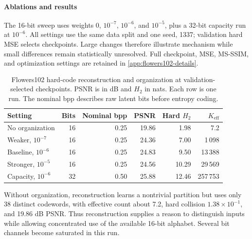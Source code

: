 \paragraph{Ablations and results}
The 16-bit sweep uses weights $0$, $10^{-7}$, $10^{-6}$, and $10^{-5}$, plus a 32-bit capacity run at $10^{-6}$.
All settings use the same data split and one seed, 1337; validation hard MSE selects checkpoints.
Large changes therefore illustrate mechanism while small differences remain statistically unresolved.
Full checkpoint, MSE, MS-SSIM, and optimization settings are retained in \ref{app:flowers102-details}.

\begin{table}[t]
\centering\small
\begin{tabular}{lrrrrr}
\toprule
Setting & Bits & Nominal bpp & PSNR & Hard $H_2$ & $K_{\mathrm{eff}}$ \\
\midrule
No organization & 16 & 0.25 & 19.86 & 1.98 & 7.2 \\
Weaker, $10^{-7}$ & 16 & 0.25 & 24.36 & 7.00 & 1\,098 \\
Baseline, $10^{-6}$ & 16 & 0.25 & 24.83 & 9.50 & 13\,388 \\
Stronger, $10^{-5}$ & 16 & 0.25 & 24.56 & 10.29 & 29\,569 \\
Capacity, $10^{-6}$ & 32 & 0.50 & 25.88 & 12.46 & 257\,753 \\
\bottomrule
\end{tabular}
\caption{Flowers102 hard-code reconstruction and organization at validation-selected checkpoints. PSNR is in dB and $H_2$ in nats. Each row is one run. The nominal bpp describes raw latent bits before entropy coding.}
\label{tab:flowers102-results}
\end{table}

Without organization, reconstruction learns a nontrivial partition but uses only 38 distinct codewords, with effective count about 7.2, hard collision $1.38\times10^{-1}$, and 19.86 dB PSNR.
Thus reconstruction supplies a reason to distinguish inputs while allowing concentrated use of the available 16-bit alphabet.
Several bit channels become saturated in this run.

